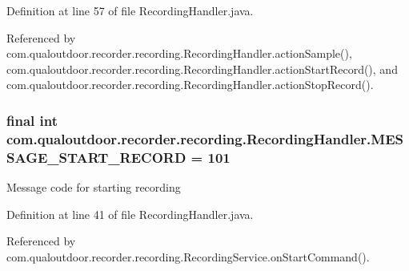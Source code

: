 Definition at line 57 of file Recording\-Handler.\-java.



Referenced by com.\-qualoutdoor.\-recorder.\-recording.\-Recording\-Handler.\-action\-Sample(), com.\-qualoutdoor.\-recorder.\-recording.\-Recording\-Handler.\-action\-Start\-Record(), and com.\-qualoutdoor.\-recorder.\-recording.\-Recording\-Handler.\-action\-Stop\-Record().

\hypertarget{classcom_1_1qualoutdoor_1_1recorder_1_1recording_1_1RecordingHandler_abdd606dfb63915fc92f7e42c9332d7f8}{
\subsubsection[{M\-E\-S\-S\-A\-G\-E\-\_\-\-S\-T\-A\-R\-T\-\_\-\-R\-E\-C\-O\-R\-D}]{\setlength{\rightskip}{0pt plus 5cm}final int com.\-qualoutdoor.\-recorder.\-recording.\-Recording\-Handler.\-M\-E\-S\-S\-A\-G\-E\-\_\-\-S\-T\-A\-R\-T\-\_\-\-R\-E\-C\-O\-R\-D = 101\hspace{0.3cm}{\ttfamily [static]}}}\label{classcom_1_1qualoutdoor_1_1recorder_1_1recording_1_1RecordingHandler_abdd606dfb63915fc92f7e42c9332d7f8}
Message code for starting recording 

Definition at line 41 of file Recording\-Handler.\-java.



Referenced by com.\-qualoutdoor.\-recorder.\-recording.\-Recording\-Service.\-on\-Start\-Command().

